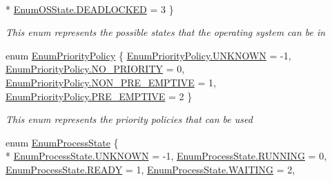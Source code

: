 \begin{DoxyCompactItemize}
\\*
\hyperlink{namespace_c_p_u___o_s___simulator_1_1_operating___system_a03a98a403abc737c106a8f92db5bffc1a0550134156d1220fe47b905f3da1080f}{Enum\+O\+S\+State.\+D\+E\+A\+D\+L\+O\+C\+K\+E\+D} = 3
 \}\begin{DoxyCompactList}\small\item\em This enum represents the possible states that the operating system can be in \end{DoxyCompactList}
\item 
enum \hyperlink{namespace_c_p_u___o_s___simulator_1_1_operating___system_a3a9286a473bd079e9c65908c0378fa00}{Enum\+Priority\+Policy} \{ \hyperlink{namespace_c_p_u___o_s___simulator_1_1_operating___system_a3a9286a473bd079e9c65908c0378fa00a696b031073e74bf2cb98e5ef201d4aa3}{Enum\+Priority\+Policy.\+U\+N\+K\+N\+O\+W\+N} = -\/1, 
\hyperlink{namespace_c_p_u___o_s___simulator_1_1_operating___system_a3a9286a473bd079e9c65908c0378fa00a9f68f1d26dd059f9a73e5f66a83bef80}{Enum\+Priority\+Policy.\+N\+O\+\_\+\+P\+R\+I\+O\+R\+I\+T\+Y} = 0, 
\hyperlink{namespace_c_p_u___o_s___simulator_1_1_operating___system_a3a9286a473bd079e9c65908c0378fa00a991a81df1486f1b97a90776f3026ff96}{Enum\+Priority\+Policy.\+N\+O\+N\+\_\+\+P\+R\+E\+\_\+\+E\+M\+P\+T\+I\+V\+E} = 1, 
\hyperlink{namespace_c_p_u___o_s___simulator_1_1_operating___system_a3a9286a473bd079e9c65908c0378fa00a952140b26aa6080871aab2eb7a96feb0}{Enum\+Priority\+Policy.\+P\+R\+E\+\_\+\+E\+M\+P\+T\+I\+V\+E} = 2
 \}\begin{DoxyCompactList}\small\item\em This enum represents the priority policies that can be used \end{DoxyCompactList}
\item 
enum \hyperlink{namespace_c_p_u___o_s___simulator_1_1_operating___system_a836ee2204e78fcb3a7dd6c3c942b1a24}{Enum\+Process\+State} \{ \\*
\hyperlink{namespace_c_p_u___o_s___simulator_1_1_operating___system_a836ee2204e78fcb3a7dd6c3c942b1a24a696b031073e74bf2cb98e5ef201d4aa3}{Enum\+Process\+State.\+U\+N\+K\+N\+O\+W\+N} = -\/1, 
\hyperlink{namespace_c_p_u___o_s___simulator_1_1_operating___system_a836ee2204e78fcb3a7dd6c3c942b1a24a43491564ebcfd38568918efbd6e840fd}{Enum\+Process\+State.\+R\+U\+N\+N\+I\+N\+G} = 0, 
\hyperlink{namespace_c_p_u___o_s___simulator_1_1_operating___system_a836ee2204e78fcb3a7dd6c3c942b1a24a2baa69eafc7204f3bd8648eba580c489}{Enum\+Process\+State.\+R\+E\+A\+D\+Y} = 1, 
\hyperlink{namespace_c_p_u___o_s___simulator_1_1_operating___system_a836ee2204e78fcb3a7dd6c3c942b1a24a1869d56535e8b1449a6da54ff5e11f50}{Enum\+Process\+State.\+W\+A\+I\+T\+I\+N\+G} = 2, 

\end{DoxyCompactItemize}
